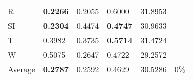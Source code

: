 \documentclass[11pt, a4paper]{article}
\begin{document}
\begin{table}[H]
\begin{tabular}{llllll}
R                                & \textbf{0.2266}                   & 0.2055                            & 0.6000                               & 31.8953                                     &                                   \\
SI                        & \textbf{0.2304}                   & 0.4474                            & \textbf{0.4747}                      & 30.9633                                     &                                   \\
T                              & 0.3982                            & 0.3735                            & \textbf{0.5714}                      & 31.4724                                     &                                   \\
W                             & 0.5075                            & 0.2647                            & 0.4722                               & 29.2572                                     &                                   \\ \hline
Average                               & \textbf{0.2787}                   & 0.2592                            & 0.4629                               & 30.5286                                     & 0\%
\end{tabular}
\end{table}
\end{document}
